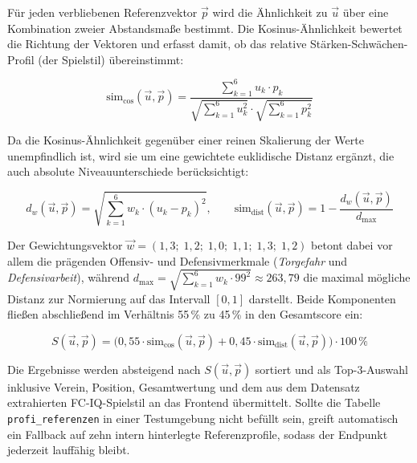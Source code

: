 Für jeden verbliebenen Referenzvektor $\vec{p}$ wird die Ähnlichkeit zu
$\vec{u}$ über eine Kombination zweier Abstandsmaße bestimmt. Die
Kosinus-Ähnlichkeit bewertet die Richtung der Vektoren und erfasst damit, ob
das relative Stärken-Schwächen-Profil (der Spielstil) übereinstimmt:

\begin{equation}
    \mathrm{sim}_{\cos}(\vec{u}, \vec{p}) =
    \frac{\sum_{k=1}^{6} u_k \cdot p_k}
    {\sqrt{\sum_{k=1}^{6} u_k^2} \cdot \sqrt{\sum_{k=1}^{6} p_k^2}}
    \label{eq:cosine}
\end{equation}

Da die Kosinus-Ähnlichkeit gegenüber einer reinen Skalierung der Werte
unempfindlich ist, wird sie um eine gewichtete euklidische Distanz ergänzt, die
auch absolute Niveauunterschiede berücksichtigt:

\begin{equation}
    d_w(\vec{u}, \vec{p}) = \sqrt{\sum_{k=1}^{6} w_k \cdot (u_k - p_k)^2},
    \qquad
    \mathrm{sim}_{\mathrm{dist}}(\vec{u}, \vec{p}) = 1 - \frac{d_w(\vec{u}, \vec{p})}{d_{\max}}
    \label{eq:euklid}
\end{equation}

Der Gewichtungsvektor $\vec{w} = (1{,}3;\; 1{,}2;\; 1{,}0;\; 1{,}1;\; 1{,}3;\; 1{,}2)$
betont dabei vor allem die prägenden Offensiv- und Defensivmerkmale
(\textit{Torgefahr} und \textit{Defensivarbeit}), während
$d_{\max} = \sqrt{\sum_{k=1}^{6} w_k \cdot 99^2} \approx 263{,}79$ die maximal
mögliche Distanz zur Normierung auf das Intervall $[0, 1]$ darstellt. Beide
Komponenten fließen abschließend im Verhältnis 55\,\% zu 45\,\% in den
Gesamtscore ein:

\begin{equation}
    S(\vec{u}, \vec{p}) = \big(0{,}55 \cdot \mathrm{sim}_{\cos}(\vec{u}, \vec{p})
    + 0{,}45 \cdot \mathrm{sim}_{\mathrm{dist}}(\vec{u}, \vec{p})\big) \cdot 100\,\%
    \label{eq:gesamtscore}
\end{equation}

Die Ergebnisse werden absteigend nach $S(\vec{u}, \vec{p})$ sortiert und als
Top-3-Auswahl inklusive Verein, Position, Gesamtwertung und dem aus dem
Datensatz extrahierten FC-IQ-Spielstil an das Frontend übermittelt. Sollte die
Tabelle \texttt{profi\_referenzen} in einer Testumgebung nicht befüllt sein,
greift automatisch ein Fallback auf zehn intern hinterlegte Referenzprofile,
sodass der Endpunkt jederzeit lauffähig bleibt.